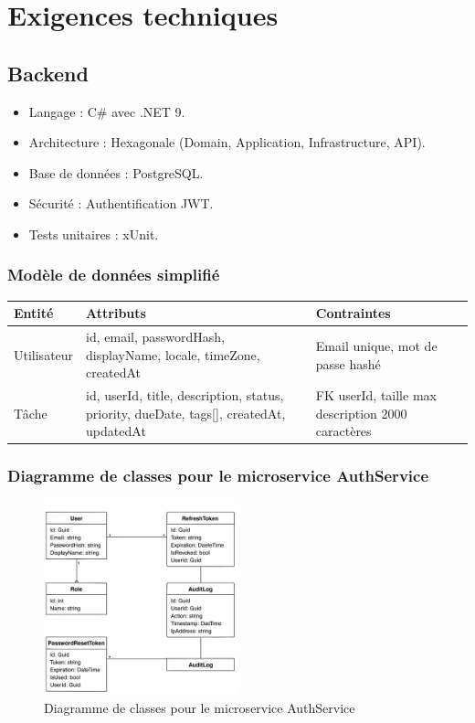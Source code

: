 \section{Exigences techniques}
\subsection{Backend}
\begin{itemize}
	\item Langage : C\# avec .NET 9.
	\item Architecture : Hexagonale (Domain, Application, Infrastructure, API).
	\item Base de données : PostgreSQL.
	\item Sécurité : Authentification JWT.
	\item Tests unitaires : xUnit.
\end{itemize}

\subsubsection{Modèle de données simplifié}
\begin{tabular}{|l|p{5cm}|p{6cm}|}
	\hline
	\textbf{Entité} & \textbf{Attributs} & \textbf{Contraintes} \\ \hline
	Utilisateur & id, email, passwordHash, displayName, locale, timeZone, createdAt & Email unique, mot de passe hashé \\ \hline
	Tâche & id, userId, title, description, status, priority, dueDate, tags[], createdAt, updatedAt & FK userId, taille max description 2000 caractères \\ \hline
\end{tabular}
\subsubsection{Diagramme de classes pour le microservice AuthService}
\begin{figure}[H]
	\centering
	\includegraphics[width=0.5\textwidth]{images/MVP1_MCD.png}
	\caption{Diagramme de classes pour le microservice AuthService}
\end{figure}

